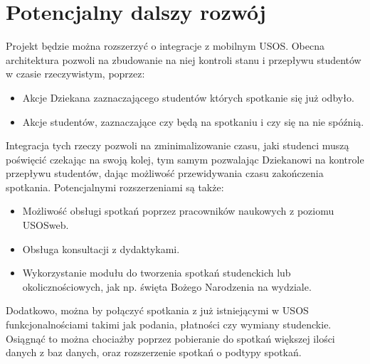 \documentclass[licencjacka]{pracamgr}
\begin{document}


\chapter{Potencjalny dalszy rozwój}  \label{chap:rozwoj}

Projekt będzie można rozszerzyć o integracje z mobilnym USOS. Obecna architektura pozwoli na zbudowanie na niej kontroli stanu i przepływu studentów w czasie rzeczywistym, poprzez:
\begin{itemize}
	\item Akcje Dziekana zaznaczającego studentów których spotkanie się już odbyło.
	\item Akcje studentów, zaznaczające czy będą na spotkaniu i czy się na nie spóźnią.
\end{itemize}
Integracja tych rzeczy pozwoli na zminimalizowanie czasu, jaki studenci muszą poświęcić czekając na swoją kolej, tym samym pozwalając Dziekanowi na kontrole przepływu studentów, dając możliwość przewidywania czasu zakończenia spotkania. Potencjalnymi rozszerzeniami są także:
\begin{itemize}
	\item Możliwość obsługi spotkań poprzez pracowników naukowych z poziomu USOSweb.
	\item Obsługa konsultacji z dydaktykami.
	\item Wykorzystanie modułu do tworzenia spotkań studenckich lub okolicznościowych, jak np. święta Bożego Narodzenia na wydziale.
\end{itemize}

Dodatkowo, można by połączyć spotkania z już istniejącymi w USOS funkcjonalnościami takimi jak podania, płatności czy wymiany studenckie. Osiągnąć to można chociażby poprzez pobieranie do spotkań większej ilości danych z baz danych, oraz rozszerzenie spotkań o podtypy spotkań.

\end{document}
